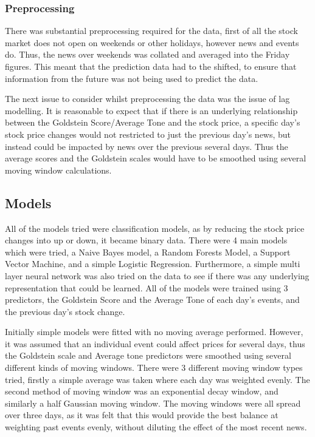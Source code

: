 \subsubsection{Preprocessing}
There was substantial preprocessing required for the data, first of all the stock market does not open on weekends or other holidays, however news and events do. Thus, the news over weekends was collated and averaged into the Friday figures. This meant that the prediction data had to the shifted, to ensure that information from the future was not being used to predict the data.

The next issue to consider whilst preprocessing the data was the issue of lag modelling. It is reasonable to expect that if there is an underlying relationship between the Goldstein Score/Average Tone and the stock price, a specific day's stock price changes would not restricted to just the previous day's news, but instead could be impacted by news over the previous several days. Thus the average scores and the Goldstein scales would have to be smoothed using several moving window calculations.

\subsection{Models}
\label{models}
All of the models tried were classification models, as by reducing the stock price changes into up or down, it became binary data. There were 4 main models which were tried, a Naive Bayes model, a Random Forests Model, a Support Vector Machine, and a simple Logistic Regression. Furthermore, a simple multi layer neural network was also tried on the data to see if there was any underlying representation that could be learned. All of the models were trained using 3 predictors, the Goldstein Score and the Average Tone of each day's events, and the previous day's stock change. 

Initially simple models were fitted with no moving average performed. However, it was assumed that an individual event could affect prices for several days, thus the Goldstein scale and Average tone predictors were smoothed using several different kinds of moving windows. There were 3 different moving window types tried, firstly a simple average was taken where each day was weighted evenly. The second method of moving window was an exponential decay window, and similarly a half Gaussian moving window. The moving windows were all spread over three days, as it was felt that this would provide the best balance at weighting past events evenly, without diluting the effect of the most recent news.

